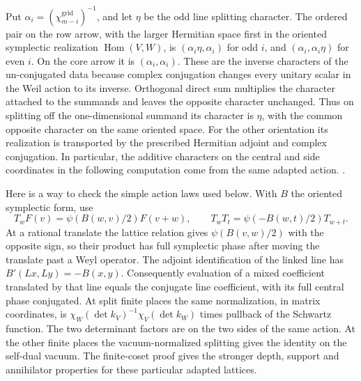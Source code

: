 Put \(\alpha_i=(\chi^{\mathrm{grid}}_{m-i})^{-1}\), and let
\(\eta\) be the odd line splitting character. The ordered pair
on the row arrow, with the larger Hermitian space first in the
oriented symplectic realization \(\operatorname{Hom}(V,W)\), is
\((\alpha_i\eta,\alpha_i)\) for odd \(i\), and
\((\alpha_i,\alpha_i\eta)\) for even \(i\). On the core
arrow it is \((\alpha_i,\alpha_i)\). These are the inverse
characters of the un-conjugated data because complex conjugation
changes every unitary scalar in the Weil action to its inverse.
Orthogonal direct sum multiplies the character attached to the
summands and leaves the opposite character unchanged. Thus on
splitting off the one-dimensional summand its character is
\(\eta\), with the common opposite character on the same
oriented space. For the other orientation its realization is
transported by the prescribed Hermitian adjoint and complex
conjugation. In particular, the additive characters on the central
and side coordinates in the following computation come from the
same adapted action.
.

Here is a way to check the simple action laws used below.
With \(B\) the oriented symplectic form, use
\[
 T_w F(v)=\psi(B(w,v)/2)F(v+w),\qquad
 T_wT_t=\psi(-B(w,t)/2)T_{w+t}.
\]
At a rational translate the lattice relation gives
\(\psi(B(v,w)/2)\) with the opposite sign, so their product
has full symplectic phase after moving the translate past a Weyl
operator. The adjoint identification of the linked line has
\(B'(Lx,Ly)=-B(x,y)\). Consequently evaluation of a mixed
coefficient translated by that line equals the conjugate line
coefficient, with its full central phase conjugated. At split finite
places the same normalization, in matrix coordinates, is
\(\chi_W(\det k_V)^{-1}\chi_V(\det k_W)\) times pullback
of the Schwartz function. The two determinant factors are on the
two sides of the same action. At the other finite places the
vacuum-normalized splitting gives the identity on the self-dual
vacuum. The finite-coset proof gives the stronger depth, support and
annihilator properties for these particular adapted lattices.

